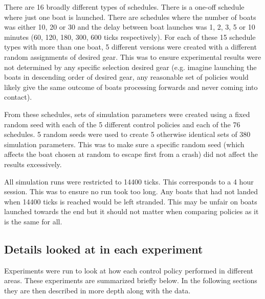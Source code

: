   There are 16 broadly different types of schedules. There is a one-off schedule where just one boat is launched. There are schedules where the number of boats was either 10, 20 or 30 and the delay between boat launches was 1, 2, 3, 5 or 10 minutes (60, 120, 180, 300, 600 ticks respectively).  For each of these 15 schedule types with more than one boat, 5 different versions were created with a different random assignments of desired gear. This was to ensure experimental results were not determined by any specific selection desired gear (e.g. imagine launching the boats in descending order of desired gear, any reasonable set of policies would likely give the same outcome of boats processing forwards and never coming into contact).
  
  From these schedules, sets of simulation parameters were created
  using a fixed random seed with each of the 5 different control
  policies and each of the 76 schedules. 5 random seeds were used to
  create 5 otherwise identical sets of 380 simulation parameters. This
  was to make sure a specific random seed (which affects the boat
  chosen at random to escape first from a crash) did not affect the
  results excessively.

  All simulation runs were restricted to 14400 ticks. This corresponds
  to a 4 hour session. This was to ensure no run took too long. Any
  boats that had not landed when 14400 ticks is reached would be left
  stranded. This may be unfair on boats launched towards the end but
  it should not matter when comparing policies as it is the same for all.
  
  \subsection{Details looked at in each experiment}
  Experiments were run to look at how each control policy performed in
  different areas. These experiments are summarized briefly below. In
  the following sections they are then described in more depth along
  with the data.

